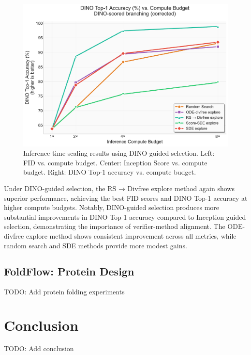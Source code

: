 \documentclass{article}
\begin{document}
\begin{figure}[H]
\begin{minipage}{0.32\textwidth}
  \end{minipage}
  \hfill
  \begin{minipage}{0.32\textwidth}
    \centering
    \includegraphics[width=\textwidth]{figures/scaling_dino_top1.pdf}
  \end{minipage}
  \caption{Inference-time scaling results using DINO-guided selection. Left: FID vs. compute budget. Center: Inception Score vs. compute budget. Right: DINO Top-1 accuracy vs. compute budget.}
  \label{fig:dino-scaling}
\end{figure}

Under DINO-guided selection, the RS → Divfree explore method again shows superior performance, achieving the best FID scores and DINO Top-1 accuracy at higher compute budgets. Notably, DINO-guided selection produces more substantial improvements in DINO Top-1 accuracy compared to Inception-guided selection, demonstrating the importance of verifier-method alignment. The ODE-divfree explore method shows consistent improvement across all metrics, while random search and SDE methods provide more modest gains.

\subsection{FoldFlow: Protein Design}

TODO: Add protein folding experiments

\section{Conclusion}

TODO: Add conclusion
\end{document}

